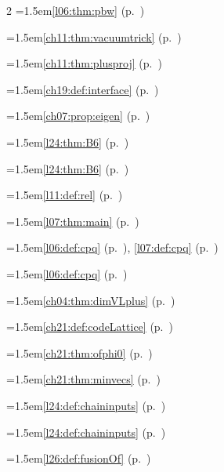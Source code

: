 \begin{multicols}{2}
\hangindent=1.5em\quad \ref{l06:thm:pbw} (p.~\pageref{l06:thm:pbw})\par
\hangindent=1.5em\quad \ref{ch11:thm:vacuumtrick} (p.~\pageref{ch11:thm:vacuumtrick})\par
\hangindent=1.5em\quad \ref{ch11:thm:plusproj} (p.~\pageref{ch11:thm:plusproj})\par
\hangindent=1.5em\quad \ref{ch19:def:interface} (p.~\pageref{ch19:def:interface})\par
\hangindent=1.5em\quad \ref{ch07:prop:eigen} (p.~\pageref{ch07:prop:eigen})\par
\hangindent=1.5em\quad \ref{l24:thm:B6} (p.~\pageref{l24:thm:B6})\par
\hangindent=1.5em\quad \ref{l24:thm:B6} (p.~\pageref{l24:thm:B6})\par
\hangindent=1.5em\quad \ref{l11:def:rel} (p.~\pageref{l11:def:rel})\par
\hangindent=1.5em\quad \ref{l07:thm:main} (p.~\pageref{l07:thm:main})\par
\hangindent=1.5em\quad \ref{l06:def:cpq} (p.~\pageref{l06:def:cpq}), \ref{l07:def:cpq} (p.~\pageref{l07:def:cpq})\par
\hangindent=1.5em\quad \ref{l06:def:cpq} (p.~\pageref{l06:def:cpq})\par
\hangindent=1.5em\quad \ref{ch04:thm:dimVLplus} (p.~\pageref{ch04:thm:dimVLplus})\par
\hangindent=1.5em\quad \ref{ch21:def:codeLattice} (p.~\pageref{ch21:def:codeLattice})\par
\hangindent=1.5em\quad \ref{ch21:thm:ofphi0} (p.~\pageref{ch21:thm:ofphi0})\par
\hangindent=1.5em\quad \ref{ch21:thm:minvecs} (p.~\pageref{ch21:thm:minvecs})\par
\hangindent=1.5em\quad \ref{l24:def:chaininputs} (p.~\pageref{l24:def:chaininputs})\par
\hangindent=1.5em\quad \ref{l24:def:chaininputs} (p.~\pageref{l24:def:chaininputs})\par
\hangindent=1.5em\quad \ref{l26:def:fusionOf} (p.~\pageref{l26:def:fusionOf})\par

\end{multicols}
